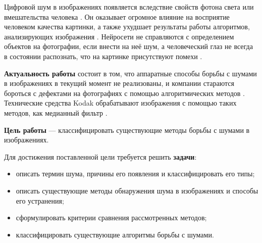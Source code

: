 Цифровой шум в изображениях появляется вследствие свойств фотона света или вмешательства человека \cite{shum}.
Он оказывает огромное влияние на восприятие человеком качества картинки, а также ухудшает результаты работы алгоритмов, анализирующих изображения \cite{software}. 
Нейросети не справляются с определением объектов на фотографии, если внести на неё шум, а человеческий глаз не всегда в состоянии распознать, что на картинке присутствуют помехи \cite{nn1s}.

\textbf{Актуальность работы} состоит в том, что аппаратные способы борьбы с шумами в изображениях в текущий момент не реализованы, и компании стараются бороться с дефектами на фотографиях с помощью алгоритмических методов \cite{software}. 
Технические средства Kodak обрабатывают изображения с помощью таких методов, как медианный фильтр \cite{kodak}.

\textbf{Цель работы} --- классифицировать существующие методы борьбы с шумами в изображениях.

Для достижения поставленной цели требуется решить \textbf{задачи}:
\begin{itemize}
\item описать термин шума, причины его появления и классифицировать его типы;
\item описать существующие методы обнаружения шума в изображениях и способы его устранения;
\item сформулировать критерии сравнения рассмотренных методов;
\item классифицировать существующие алгоритмы борьбы с шумами.
\end{itemize}
